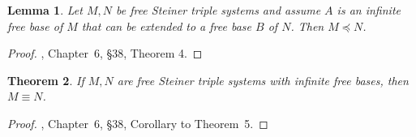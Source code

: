 \documentclass[a4paper, 11pt]{article}
\theoremstyle{note}
\newtheorem{thm}{Theorem}[section]
\newtheorem{lemma}[thm]{Lemma}
\begin{document}
	\begin{lemma} \label{lemma2_6}  Let $M,N$ be free Steiner triple systems and assume $A$ is an infinite free base of $M$ that can be extended to a free base $B$ of $N$.  Then  $M\preccurlyeq N$.
	\end{lemma}
	\begin{proof} \cite{gratzer}, Chapter~6, \S 38, Theorem 4.
	
	\end{proof}
	
	\begin{thm} If $M,N$ are  free Steiner triple systems with infinite free bases, then    $M \equiv N$.
	\end{thm}
	\begin{proof}   \cite{gratzer}, Chapter~6, \S 38, Corollary to Theorem~5.
	\end{proof}
	
\end{document}
